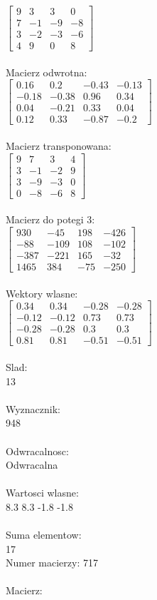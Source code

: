 \documentclass[a4paper,12pt]{article}
\begin{document}
$\begin{bmatrix} 9&3&3&0\\7&-1&-9&-8\\3&-2&-3&-6\\4&9&0&8 \end{bmatrix}$
\\
\\
Macierz odwrotna:\\

$\begin{bmatrix} 0.16&0.2&-0.43&-0.13\\-0.18&-0.38&0.96&0.34\\0.04&-0.21&0.33&0.04\\0.12&0.33&-0.87&-0.2 \end{bmatrix}$
\\
\\
Macierz transponowana:\\

$\begin{bmatrix} 9&7&3&4\\3&-1&-2&9\\3&-9&-3&0\\0&-8&-6&8 \end{bmatrix}$
\\
\\
Macierz do potegi 3:\\

$\begin{bmatrix} 930&-45&198&-426\\-88&-109&108&-102\\-387&-221&165&-32\\1465&384&-75&-250 \end{bmatrix}$
\\
\\
Wektory wlasne:\\

$\begin{bmatrix} 0.34&0.34&-0.28&-0.28\\-0.12&-0.12&0.73&0.73\\-0.28&-0.28&0.3&0.3\\0.81&0.81&-0.51&-0.51 \end{bmatrix}$
\\
\\
Slad:\\
13
\\
\\
Wyznacznik:\\
948
\\
\\
Odwracalnosc:\\
Odwracalna
\\
\\
Wartosci wlasne:\\
8.3 8.3 -1.8 -1.8
\\
\\
Suma elementow:\\
17
\\
\newpage
Numer macierzy:
717
\\
\\
Macierz:\\
\end{document}
